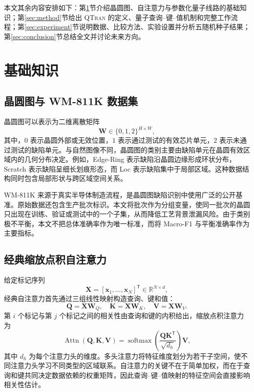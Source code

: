 \documentclass[journal]{IEEEtran}
\newcommand{\qtran}{\textsc{QTran}}
\newcommand{\wm}{\textsc{WM-811K}}
\newcommand{\R}{\mathbb{R}}
\begin{document}
本文其余内容安排如下：第\ref{sec:preliminaries}节介绍晶圆图、自注意力与参数化量子线路的基础知识；第\ref{sec:method}节给出 \qtran{} 的定义、量子查询--键--值机制和完整工作流程；第\ref{sec:experiment}节说明数据、比较方法、实验设置并分析五随机种子结果；第\ref{sec:conclusion}节总结全文并讨论未来方向。

\section{基础知识}
\label{sec:preliminaries}

\subsection{晶圆图与 \wm{} 数据集}

晶圆图可以表示为二维离散矩阵
\begin{equation}
  \bm{W}\in\{0,1,2\}^{H\times W},
\end{equation}
其中，$0$ 表示晶圆外部或无效位置，$1$ 表示通过测试的有效芯片单元，$2$ 表示未通过测试的缺陷单元。与自然图像不同，晶圆图的类别主要由缺陷单元在晶圆有效区域内的几何分布决定。例如，Edge-Ring 表示缺陷沿晶圆边缘形成环状分布，Scratch 表示缺陷呈细长划痕形态，而 Loc 表示缺陷集中于局部区域。这种数据结构同时包含局部形状与跨区域空间关系。

\wm{} 来源于真实半导体制造流程，是晶圆图缺陷识别中使用广泛的公开基准\cite{wu2015wafer}。原始数据还包含生产批次标识。本文将批次作为分组变量，使同一批次的晶圆只出现在训练、验证或测试中的一个子集，从而降低工艺背景泄漏风险。由于类别极不平衡，本文不把总体准确率作为唯一标准，而将 Macro-F1 与平衡准确率作为主要指标。

\subsection{经典缩放点积自注意力}

给定标记序列
\begin{equation}
  \bm{X}=[\bm{x}_1,\ldots,\bm{x}_N]^\mathsf{T}\in\R^{N\times d},
\end{equation}
经典自注意力首先通过三组线性映射构造查询、键和值：
\begin{equation}
  \bm{Q}=\bm{X}\bm{W}_Q,\quad
  \bm{K}=\bm{X}\bm{W}_K,\quad
  \bm{V}=\bm{X}\bm{W}_V.
  \label{eq:classic_qkv}
\end{equation}
第 $i$ 个标记与第 $j$ 个标记之间的相关性由查询和键的内积给出，缩放点积注意力为\cite{vaswani2017attention}
\begin{equation}
  \operatorname{Attn}(\bm{Q},\bm{K},\bm{V})
  =\operatorname{softmax}\left(
    \frac{\bm{Q}\bm{K}^{\mathsf T}}{\sqrt{d_h}}
  \right)\bm{V},
  \label{eq:attention}
\end{equation}
其中 $d_h$ 为每个注意力头的维度。多头注意力将特征维度划分为若干子空间，使不同注意力头学习不同类型的区域联系。自注意力的关键不在于简单加权，而在于查询和键共同决定数据依赖的权重矩阵，因此查询--键--值映射的特征空间会直接影响相关性估计。
\end{document}
